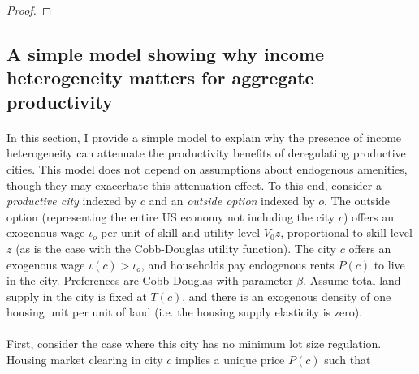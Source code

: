 \documentclass[12pt]{article}
\begin{document}
\begin{enumerate}
\begin{proof}
		\end{proof}
		
	\end{enumerate}
	
	
	\clearpage
	
	
	
	\subsection{A simple model showing why income heterogeneity matters for aggregate productivity}\label{Appendix:SimpleModelHeteroProd}
	
	\paragraph*{}
	In this section, I provide a simple model to explain why the presence of income heterogeneity can attenuate the productivity benefits of deregulating productive cities. This model does not depend on assumptions about endogenous amenities, though they may exacerbate this attenuation effect. To this end, consider a \textit{productive city} indexed by $c$ and an \textit{outside option} indexed by $o$. The outside option (representing the entire US economy not including the city $c$) offers an exogenous wage $\iota_{o}$ per unit of skill and utility level $V_{0}z$, proportional to skill level $z$ (as is the case with the Cobb-Douglas utility function).  
	The city $c$ offers an exogenous wage $\iota(c) > \iota_{o}$, and households pay endogenous rents $P(c)$ to live in the city. Preferences are Cobb-Douglas with parameter $\beta$. Assume total land supply in the city is fixed at $T(c)$, and there is an exogenous density of one housing unit per unit of land (i.e. the housing supply elasticity is zero). 
	
	
	\paragraph*{}
	First, consider the case where this city has no minimum lot size regulation. Housing market clearing in city $c$ implies a unique price $P(c)$ such that 
	
\end{document}
